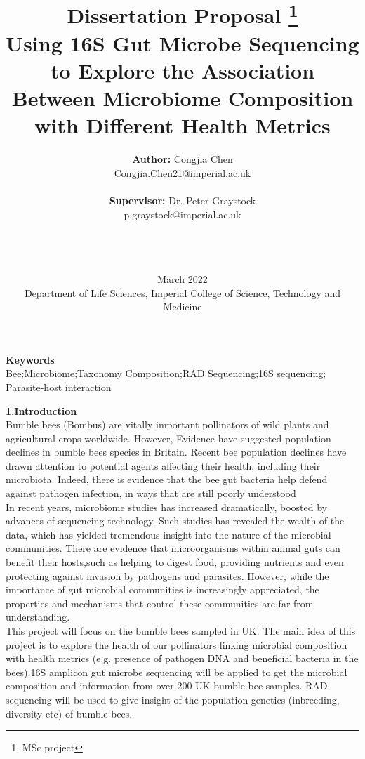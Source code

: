 \documentclass[11pt,a4paper]{article}
\title{   \textbf{ Dissertation Proposal } \thanks{MSc project}  \\
Using 16S Gut Microbe Sequencing to Explore the Association Between Microbiome Composition with Different Health Metrics}
\author{ \textbf{Author:} Congjia Chen \\ Congjia.Chen21@imperial.ac.uk \\ \\ \textbf{Supervisor:} Dr. Peter Graystock \\ p.graystock@imperial.ac.uk \\ \\  }
\date{ \\ \\March 2022 \\ Department of Life Sciences, Imperial College of Science, Technology and Medicine}
\begin{document}
\maketitle

\begin{center}
\par\textbf{ Keywords  } \\
Bee;Microbiome;Taxonomy Composition;RAD Sequencing;16S sequencing; Parasite-host interaction 

\end{center}

\newpage

\noindent\textbf{1.Introduction}\\
Bumble bees (Bombus) are vitally important pollinators of wild plants and agricultural crops worldwide\citep{kwong_gut_2016}. However, Evidence have suggested population declines in bumble bees species in Britain\citep{powney_widespread_2019}. Recent bee population declines have drawn attention to potential agents affecting their health, including their microbiota. Indeed, there is evidence that the bee gut bacteria help defend against pathogen infection, in ways that are still poorly understood\citep{kwong_gut_2016,koch_socially_2011,koch_gut_2012}\\
In recent years, microbiome studies has increased dramatically, boosted by advances of sequencing technology\citep{knight_best_2018}. Such studies has revealed the wealth of the data, which has yielded tremendous insight into the nature of the microbial communities\citep{cullen_emerging_2020}. There are evidence that microorganisms within animal guts can benefit their hosts,such as helping to digest food, providing nutrients and even protecting against invasion by pathogens and parasites\citep{cullen_emerging_2020}. However, while the importance of gut microbial communities is increasingly appreciated, the properties and mechanisms that control these communities are far from understanding. \\
This project will focus on the bumble bees sampled in UK. The main idea of this project is to explore the health of our pollinators linking microbial composition with health metrics (e.g. presence of pathogen DNA and beneficial bacteria in the bees).16S amplicon gut microbe sequencing will be applied to get the microbial composition and information from over 200 UK bumble bee samples. RAD-sequencing will be used to give insight of the population genetics (inbreeding, diversity etc)  of bumble bees\citep{andrews_harnessing_2016}.\\
\end{document}
